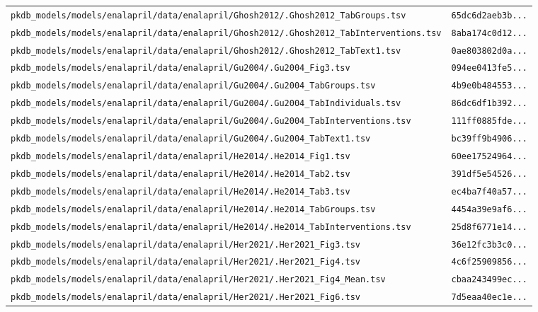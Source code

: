\documentclass{article}
\begin{document}
\begin{longtable}{ll}
\texttt{pkdb\_models/models/enalapril/data/enalapril/Ghosh2012/.Ghosh2012\_TabGroups.tsv} & \texttt{65dc6d2aeb3b...} \\
\texttt{pkdb\_models/models/enalapril/data/enalapril/Ghosh2012/.Ghosh2012\_TabInterventions.tsv} & \texttt{8aba174c0d12...} \\
\texttt{pkdb\_models/models/enalapril/data/enalapril/Ghosh2012/.Ghosh2012\_TabText1.tsv} & \texttt{0ae803802d0a...} \\
\texttt{pkdb\_models/models/enalapril/data/enalapril/Gu2004/.Gu2004\_Fig3.tsv} & \texttt{094ee0413fe5...} \\
\texttt{pkdb\_models/models/enalapril/data/enalapril/Gu2004/.Gu2004\_TabGroups.tsv} & \texttt{4b9e0b484553...} \\
\texttt{pkdb\_models/models/enalapril/data/enalapril/Gu2004/.Gu2004\_TabIndividuals.tsv} & \texttt{86dc6df1b392...} \\
\texttt{pkdb\_models/models/enalapril/data/enalapril/Gu2004/.Gu2004\_TabInterventions.tsv} & \texttt{111ff0885fde...} \\
\texttt{pkdb\_models/models/enalapril/data/enalapril/Gu2004/.Gu2004\_TabText1.tsv} & \texttt{bc39ff9b4906...} \\
\texttt{pkdb\_models/models/enalapril/data/enalapril/He2014/.He2014\_Fig1.tsv} & \texttt{60ee17524964...} \\
\texttt{pkdb\_models/models/enalapril/data/enalapril/He2014/.He2014\_Tab2.tsv} & \texttt{391df5e54526...} \\
\texttt{pkdb\_models/models/enalapril/data/enalapril/He2014/.He2014\_Tab3.tsv} & \texttt{ec4ba7f40a57...} \\
\texttt{pkdb\_models/models/enalapril/data/enalapril/He2014/.He2014\_TabGroups.tsv} & \texttt{4454a39e9af6...} \\
\texttt{pkdb\_models/models/enalapril/data/enalapril/He2014/.He2014\_TabInterventions.tsv} & \texttt{25d8f6771e14...} \\
\texttt{pkdb\_models/models/enalapril/data/enalapril/Her2021/.Her2021\_Fig3.tsv} & \texttt{36e12fc3b3c0...} \\
\texttt{pkdb\_models/models/enalapril/data/enalapril/Her2021/.Her2021\_Fig4.tsv} & \texttt{4c6f25909856...} \\
\texttt{pkdb\_models/models/enalapril/data/enalapril/Her2021/.Her2021\_Fig4\_Mean.tsv} & \texttt{cbaa243499ec...} \\
\texttt{pkdb\_models/models/enalapril/data/enalapril/Her2021/.Her2021\_Fig6.tsv} & \texttt{7d5eaa40ec1e...} \\

\end{longtable}
\end{document}
